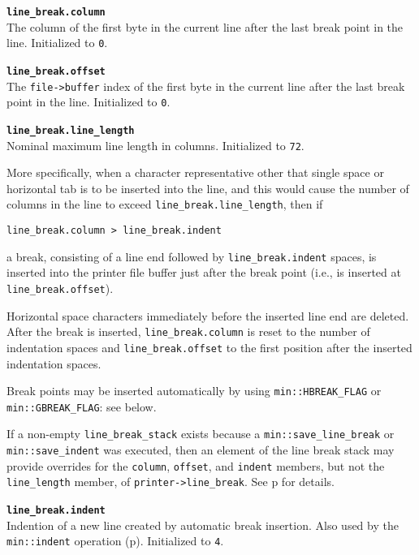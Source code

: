 \documentclass[12pt]{article}
\makeatletter
\newcommand{\TT}[1]{{\tt \bfseries #1}}
\newcommand{\ttmkey}[2]{\TT{#1}\index{#1@{\tt #1}!#2}}
\newcommand{\pagref}[1]{p\pageref{#1}}
\newcommand{\EOL}{\penalty \exhyphenpenalty}
\newenvironment{itemlist}[1][1.2in]%
	{\begin{list}{}{\setlength{\labelwidth}{#1}%
		        \setlength{\leftmargin}{\labelwidth}%
		        \addtolength{\leftmargin}{+0.2in}%
		        \renewcommand{\makelabel}[1]{##1\hfill}}}%
	{\end{list}}
\makeatother
\begin{document}
\begin{itemlist}[0.6in]

\item[\ttmkey{line\_\EOL break.column}{in {\tt min::printer}}]~\\
The column of the
first byte in the current line after the last break point in the line.
Initialized to {\tt 0}.

\item[\ttmkey{line\_\EOL break.offset}{in {\tt min::printer}}]~\\
The {\tt file->buffer} index of the
first byte in the current line after the last break point in the line.
Initialized to {\tt 0}.

\item[\ttmkey{line\_\EOL break.line\_length}{in {\tt min::printer}}]%
\label{LINE-LENGTH}~\\
Nominal maximum line length in columns.  Initialized to {\tt 72}.

More specifically,
when a character representative other that single space or horizontal
tab is to be inserted into the line, and this would cause the number
of columns in the line to exceed {\tt line\_\EOL break.line\_length}, then if
\begin{center}
\tt line\_break.column > line\_break.indent
\end{center}
a break, consisting of a line end followed by {\tt line\_break.indent}
spaces,
is inserted into the printer file buffer just after the break point
(i.e., is inserted at {\tt line\_\EOL break.offset}).

Horizontal space
characters immediately before the inserted line end are deleted.
After the break is inserted, {\tt line\_\EOL break.column} is reset to
the number of indentation spaces
and {\tt line\_\EOL break.offset} to the first position after
the inserted indentation spaces.

Break points may be inserted automatically by using
{\tt min::\EOL HBREAK\_\EOL FLAG} or
{\tt min::\EOL GBREAK\_\EOL FLAG}: see below.

If a non-empty {\tt line\_break\_stack} exists
because a {\tt min::\EOL save\_\EOL line\_\EOL break} or 
{\tt min::\EOL save\_\EOL indent} was executed,
then an element of the line break stack may provide overrides for the
{\tt column}, {\tt offset}, and
{\tt indent} members, but not the {\tt line\_\EOL length} member,
of {\tt printer->\EOL line\_\EOL break}.
See \pagref{LINE-BREAK-STACK} for details.

\item[\ttmkey{line\_\EOL break.indent}{in {\tt min::printer}}]~\\
Indention of a new line created by automatic break insertion.
Also used by the {\tt min::\EOL indent} operation (\pagref{MIN::INDENT}).
Initialized to {\tt 4}.


\end{itemlist}
\end{document}
